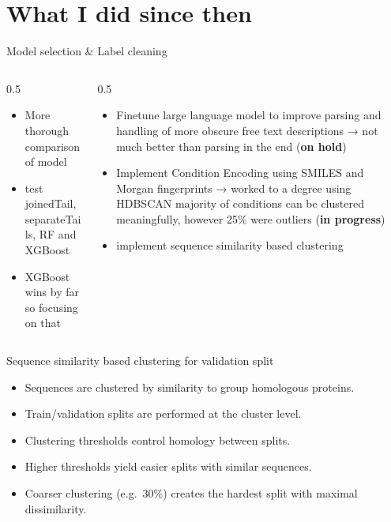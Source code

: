 \section{What I did since then}
\begin{frame}{Model selection \& Label cleaning}
	\begin{columns}[T,onlytextwidth]		
		\begin{column}{0.5\textwidth}
			\begin{itemize}
				\item \small More thorough comparison of model
				\item \small test joinedTail, separateTails, RF and XGBoost
				\item XGBoost wins by far so focusing on that
			\end{itemize}
		\end{column}
			
			
			\begin{column}{0.5\textwidth}			
				\begin{itemize}
					\item \small Finetune large language model to improve parsing and handling of more obscure free text descriptions → not much better than parsing in the end (\textbf{on hold})
					\item \small Implement Condition Encoding using SMILES and Morgan fingerprints → worked to a degree using HDBSCAN majority of conditions can be clustered meaningfully, however 25\% were outliers (\textbf{in progress})
					\item \small implement sequence similarity based clustering
				\end{itemize}
			\end{column}		
			
		\end{columns}	
	\end{frame}


\begin{frame}{Sequence similarity based clustering for validation split}
	\begin{itemize}
		\item Sequences are clustered by similarity to group homologous proteins.
		\item Train/validation splits are performed at the cluster level.
		\item Clustering thresholds control homology between splits.
		\item Higher thresholds yield easier splits with similar sequences.
		\item Coarser clustering (e.g.\ 30\%) creates the hardest split with maximal dissimilarity.
	\end{itemize}
\end{frame}

